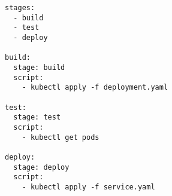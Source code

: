 \begin{verbatim}
stages:
  - build
  - test
  - deploy

build:
  stage: build
  script:
    - kubectl apply -f deployment.yaml

test:
  stage: test
  script:
    - kubectl get pods

deploy:
  stage: deploy
  script:
    - kubectl apply -f service.yaml
\end{verbatim}